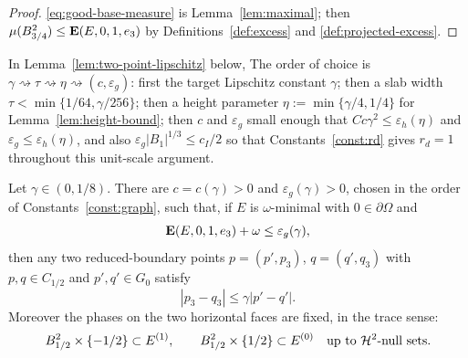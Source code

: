 \begin{proof}
\eqref{eq:good-base-measure} is Lemma~\ref{lem:maximal}; then
$\mu(B^2_{3/4})\le\operatorname{\mathbf E}(E,0,1,e_3)$ by
Definitions~\ref{def:excess} and \ref{def:projected-excess}.
\end{proof}

\begin{constants}\label{const:graph}
In Lemma~\ref{lem:two-point-lipschitz} below, The order of choice is
$\gamma\rightsquigarrow\tau\rightsquigarrow\eta\rightsquigarrow(c,\varepsilon_g)$:
first the target Lipschitz constant $\gamma$; then a slab width
$\tau<\min\{1/64,\gamma/256\}$; then a height parameter
$\eta:=\min\{\gamma/4,1/4\}$ for Lemma~\ref{lem:height-bound}; then $c$ and
$\varepsilon_g$ small enough that
$Cc\gamma^2\le\varepsilon_h(\eta)$ and
$\varepsilon_g\le\varepsilon_h(\eta)$, and also
$\varepsilon_g|B_1|^{1/3}\le c_I/2$ so that
Constants~\ref{const:rd} gives $r_d=1$ throughout this unit-scale argument.
\end{constants}

\begin{lemma}
\label{lem:two-point-lipschitz}
Let $\gamma\in(0,1/8)$.  There are $c=c(\gamma)>0$ and
$\varepsilon_g(\gamma)>0$, chosen in the order of Constants~\ref{const:graph},
such that, if $E$ is $\omega$-minimal with
$0\in\partial\Omega$ and
\begin{equation}\label{eq:graph-hyp}
  \operatorname{\mathbf E}(E,0,1,e_3)+\omega\le\varepsilon_g(\gamma),
\end{equation}
then any two reduced-boundary points $p=(p',p_3)$, $q=(q',q_3)$ with
$p,q\in C_{1/2}$ and $p',q'\in G_0$ satisfy
\begin{equation}\label{eq:two-point-lipschitz}
  |p_3-q_3|\le\gamma|p'-q'| .
\end{equation}
Moreover the phases on the two horizontal faces are fixed, in the trace
sense:
\begin{equation}\label{eq:graph-cap-separation}
 B_{1/2}^2\times\{-1/2\}\subset E^{(1)},
 \qquad
 B_{1/2}^2\times\{1/2\}\subset E^{(0)}
 \quad\text{up to }\mathcal H^2\text{-null sets}.
\end{equation}
\end{lemma}

